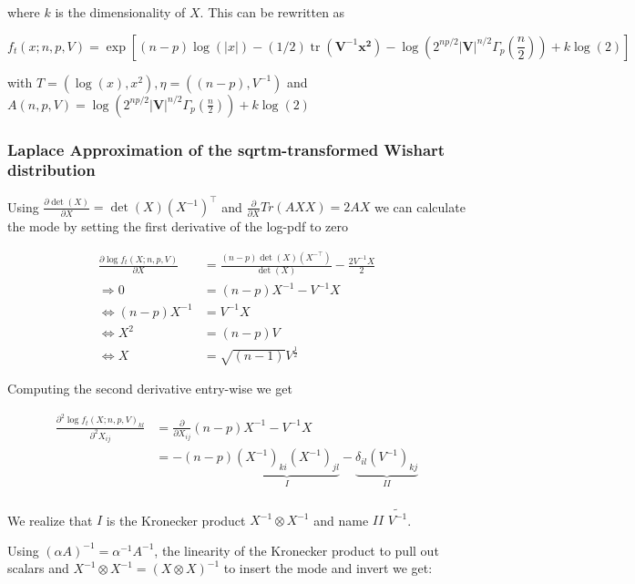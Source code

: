where $k$ is the dimensionality of $X$. This can be rewritten as 

\begin{equation}
f_t(x; n,p,V) = \exp \left[(n-p) \log(|x|) - (1/2)\operatorname{tr}({\mathbf V}^{-1}\mathbf{x^2}) - \log\left(2^{np/2} \left|{\mathbf V}\right|^{n/2} \Gamma_p\left(\frac {n}{2}\right )\right) + k\log(2) \right]
\end{equation}

with $T=(\log(x), x^2), \eta=((n-p), V^{-1})$ and $A(n,p,V)=\log\left(2^{np/2} \left|{\mathbf V}\right|^{n/2} \Gamma_p\left(\frac {n}{2}\right )\right) + k\log(2)$


\subsubsection{Laplace Approximation of the sqrtm-transformed Wishart distribution}

Using $\frac{\partial \det(X)}{\partial X} = \det(X)(X^{-1})^\top$ and $\frac{\partial}{\partial X} Tr(AXX) = 2AX$ we can calculate the mode by setting the first derivative of the log-pdf to zero

\begin{align*}
\frac{\partial \log f_t(X; n,p,V)}{\partial X} &= \frac{(n-p)\det(X)(X^{-\top})}{\det(X)} - \frac{2V^{-1}X}{2} \\
\Rightarrow 0 &= (n-p)X^{-1} - V^{-1}X \\
\Leftrightarrow  (n-p)X^{-1} &= V^{-1}X \\
\Leftrightarrow X^2 &= (n-p)V \\
\Leftrightarrow X &= \sqrt{(n-1)} V^\frac{1}{2}
\end{align*}

Computing the second derivative entry-wise we get 

\begin{align*}
\frac{\partial^2 \log f_t(X; n,p,V)_{kl}}{\partial^2 X_{ij}} &= \frac{\partial}{\partial X_{ij}} (n-p)X^{-1} - V^{-1}X \\
&= - (n-p) \underbrace{(X^{-1})_{ki} (X^{-1})_{jl}}_{I} - \underbrace{\delta_{il}(V^{-1})_{kj}}_{II} \\
\end{align*}

We realize that $I$ is the Kronecker product $X^{-1} \otimes X^{-1}$ and name $II$ $\tilde{V^{-1}}$. 

Using $(\alpha A)^{-1} = \alpha^{-1}A^{-1}$, the linearity of the Kronecker product to pull out scalars and $X^{-1} \otimes X^{-1} = (X \otimes X)^{-1}$ to insert the mode and invert we get:

